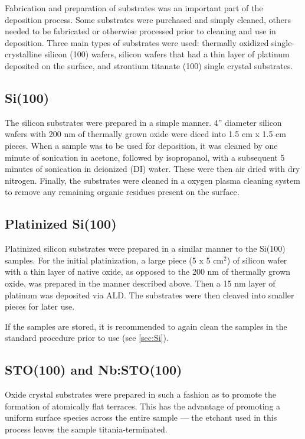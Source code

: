 Fabrication and preparation of substrates was an important part of the deposition process. Some substrates were purchased and simply cleaned, others needed to be fabricated or otherwise processed prior to cleaning and use in deposition. Three main types of substrates were used: thermally oxidized single-crystalline silicon (100) wafers, silicon wafers that had a thin layer of platinum deposited on the surface, and strontium titanate (100) single crystal substrates. 

\subsection{Si(100)} \label{sec:Si}

The silicon substrates were prepared in a simple manner. 4'' diameter silicon wafers with 200 nm of thermally grown oxide were diced into 1.5 cm x 1.5 cm pieces. When a sample was to be used for deposition, it was cleaned by one minute of sonication in acetone, followed by isopropanol, with a subsequent 5 minutes of sonication in deionized (DI) water. These were then air dried with dry nitrogen. Finally, the substrates were cleaned in a oxygen plasma cleaning system to remove any remaining organic residues present on the surface. 



\subsection{Platinized Si(100)}

Platinized silicon substrates were prepared in a similar manner to the Si(100) samples. For the initial platinization, a large piece (5 x 5 cm$^{2}$) of silicon wafer with a thin layer of native oxide, as opposed to the 200 nm of thermally grown oxide, was prepared in the manner described above. Then a 15 nm layer of platinum was deposited via ALD. The substrates were then cleaved into smaller pieces for later use. 

If the samples are stored, it is recommended to again clean the samples in the standard procedure prior to use (see \vref{sec:Si}).


\subsection{STO(100) and Nb:STO(100)}

Oxide crystal substrates were prepared in such a fashion as to promote the formation of atomically flat terraces. This has the advantage of promoting a uniform surface species across the entire sample --- the etchant used in this process leaves the sample titania-terminated. 

